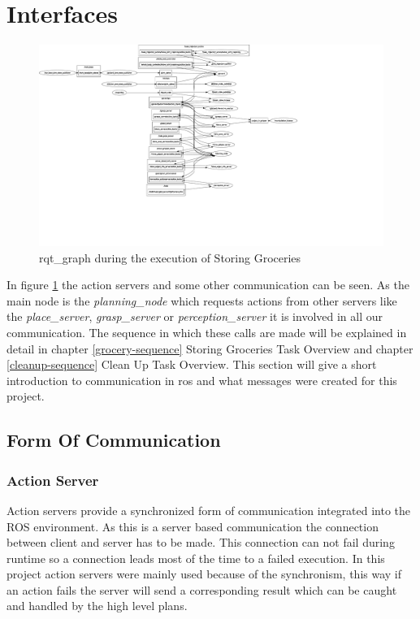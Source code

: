 \documentclass[main.tex]{subfiles}
\begin{document}
		\section{Interfaces}
		\begin{figure}[H]
			\centering
			\includegraphics[width=1.5\textwidth]{pictures/diagramms/rqt_interfaces_grocery_vertical}
			\caption{rqt\_graph during the execution of Storing Groceries}
			\label{interfaces}
		\end{figure}

		In figure \ref{interfaces} the action servers and some other communication can be seen. As the main node is the \textit{planning\_node} which requests actions from other servers like the \textit{place\_server}, \textit{grasp\_server} or \textit{perception\_server} it is involved in all our communication. The sequence in which these calls are made will be explained in detail in chapter \ref{grocery-sequence} Storing Groceries Task Overview and chapter \ref{cleanup-sequence} Clean Up Task Overview. This section will give a short introduction to communication in ros and what messages were created for this project.

		\subsection{Form Of Communication}
		
			\subsubsection{Action Server}
			
			Action servers provide a synchronized form of communication integrated into the ROS environment. As this is a server based communication the connection between client and server has to be made. This connection can not fail during runtime so a connection leads most of the time to a failed execution. In this project action servers were mainly used because of the synchronism, this way if an action fails the server will send a corresponding result which can be caught and handled by the high level plans.
			
\end{document}
